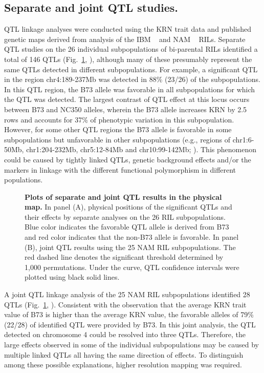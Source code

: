 \documentclass[10pt,letterpaper]{article}
\begin{document}
\subsection*{Separate and joint QTL studies.}

QTL linkage analyses were conducted using the KRN trait data and published genetic maps derived from analysis of the IBM ~\cite{Liu2010} and NAM ~\cite{Buckler2009} RILs. Separate QTL studies on the 26 individual subpopulations of bi-parental RILs identified a total of 146 QTLs (Fig.~\ref{fig2}, ), although many of these presumably represent the same QTLs detected in different subpopulations. For example, a significant QTL in the region chr4:189-237Mb was detected in 88\% (23/26) of the subpopulations. In this QTL region, the B73 allele was favorable in all subpopulations for which the QTL was detected. The largest contrast of QTL effect at this locus occurs between B73 and NC350 alleles, wherein the B73 allele increases KRN by 2.5 rows and accounts for 37\% of phenotypic variation in this subpopulation. However, for some other QTL regions the B73 allele is favorable in some subpopulations but unfavorable in other subpopulations (e.g., regions of chr1:6-50Mb, chr1:204-232Mb, chr5:12-84Mb and chr10:99-142Mb; ). This phenomenon could be caused by tightly linked QTLs, genetic background effects and/or the markers in linkage with the different functional polymorphism in different populations.

\begin{figure}[h]
\caption{{\bf Plots of separate and joint QTL results in the physical map.}
In panel (A), physical positions of the significant QTLs and their effects by separate analyses on the 26 RIL subpopulations. Blue color indicates the favorable QTL allele is derived from B73 and red color indicates that the non-B73 allele is favorable. In panel (B), joint QTL results using the 25 NAM RIL subpopulations. The red dashed line denotes the significant threshold determined by 1,000 permutations. Under the curve, QTL confidence intervals were plotted using black solid lines.}
\label{fig2}
\end{figure}


A joint QTL linkage analysis of the 25 NAM RIL subpopulations identified 28 QTLs (Fig.~\ref{fig2}, ). Consistent with the observation that the average KRN trait value of B73 is higher than the average KRN value, the favorable alleles of 79\% (22/28) of identified QTL were provided by B73. In this joint analysis, the QTL detected on chromosome 4 could be resolved into three QTLs. Therefore, the large effects observed in some of the individual subpopulations may be caused by multiple linked QTLs all having the same direction of effects. To distinguish among these possible explanations, higher resolution mapping was required.
\end{document}
